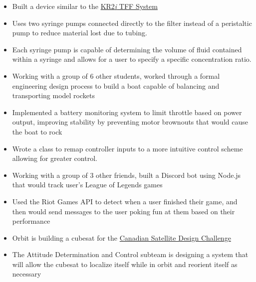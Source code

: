 \documentclass{resume}
\begin{document}
\TechnicalProjects

\begin{itemize}
    \item Built a device similar to the \href{http://spectrumlabs.com/filtration/KR2System.html}{KR2\textit{i} TFF System}
    \item Uses two syringe pumps connected directly to the filter instead of a peristaltic pump to reduce material lost due to tubing.
    \item Each syringe pump is capable of determining the volume of fluid contained within a syringe and allows for a user to specify a specific concentration ratio.
\end{itemize}

\begin{itemize}
	\item Working with a group of 6 other students, worked through a formal engineering design process to build a boat capable of balancing and transporting model rockets
	\item Implemented a battery monitoring system to limit throttle based on power output, improving stability by preventing motor brownouts that would cause the boat to rock
	\item Wrote a class to remap controller inputs to a more intuitive control scheme allowing for greater control.
\end{itemize}
\pagebreak

\begin{itemize}
	\item Working with a group of 3 other friends, built a Discord bot using Node.js that would track user's League of Legends games
	\item Used the Riot Games API to detect when a user finished their game, and then would send messages to the user poking fun at them based on their performance
\end{itemize}

\StudentTeams

\begin{itemize}
    \item Orbit is building a cubesat for the \href{https://www.csdcms.ca/}{Canadian Satellite Design Challenge}
    \item The Attitude Determination and Control subteam is designing a system that will allow the cubesat to localize itself while in orbit and reorient itself as necessary
\end{itemize}
\end{document}
